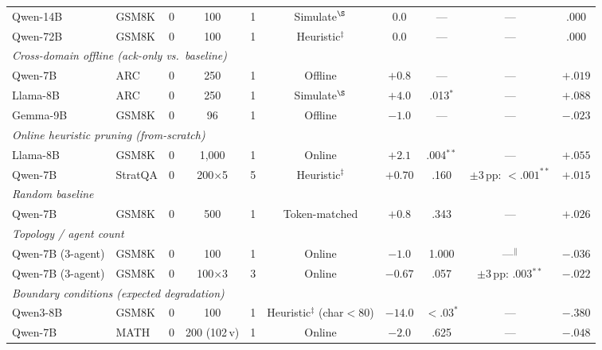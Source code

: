 \begin{table}[ht]
{\begin{tabular}{llccrccccc}
\midrule
Qwen-14B & GSM8K & 0 & 100 & 1 & Simulate$^\S$ & $0.0$ & --- & --- & $.000$ \\
Qwen-72B & GSM8K & 0 & 100 & 1 & Heuristic$^\ddagger$ & $0.0$ & --- & --- & $.000$ \\
\midrule
\multicolumn{10}{l}{\emph{Cross-domain offline (ack-only vs.\ baseline)}} \\
\midrule
Qwen-7B & ARC & 0 & 250 & 1 & Offline & $+0.8$ & --- & --- & $+.019$ \\
Llama-8B & ARC & 0 & 250 & 1 & Simulate$^\S$ & $+4.0$ & .013$^*$ & --- & $+.088$ \\
Gemma-9B & GSM8K & 0 & 96 & 1 & Offline & $-1.0$ & --- & --- & $-.023$ \\
\midrule
\multicolumn{10}{l}{\emph{Online heuristic pruning (from-scratch)}} \\
\midrule
Llama-8B & GSM8K & 0 & 1{,}000 & 1 & Online & $+2.1$ & .004$^{**}$ & --- & $+.055$ \\
Qwen-7B & StratQA & 0 & 200$\times$5 & 5 & Heuristic$^\ddagger$ & $+0.70$ & .160 & $\pm$3\,pp: ${<}.001^{**}$ & $+.015$ \\
\midrule
\multicolumn{10}{l}{\emph{Random baseline}} \\
\midrule
Qwen-7B & GSM8K & 0 & 500 & 1 & Token-matched & $+0.8$ & .343 & --- & $+.026$ \\
\midrule
\multicolumn{10}{l}{\emph{Topology / agent count}} \\
\midrule
Qwen-7B (3-agent) & GSM8K & 0 & 100 & 1 & Online & $-1.0$ & 1.000 & ---$^\|$ & $-.036$ \\
Qwen-7B (3-agent) & GSM8K & 0 & 100$\times$3 & 3 & Online & $-0.67$ & .057 & $\pm$3\,pp: .003$^{**}$ & $-.022$ \\
\midrule
\multicolumn{10}{l}{\emph{Boundary conditions (expected degradation)}} \\
\midrule
Qwen3-8B & GSM8K & 0 & 100 & 1 & Heuristic$^\ddagger$ (char$<$80) & $-14.0$ & ${<}.03^{*}$ & --- & $-.380$ \\
Qwen-7B & MATH & 0 & 200 (102\,v) & 1 & Online & $-2.0$ & .625 & --- & $-.048$ \\
\bottomrule
\end{tabular}%
}
\end{table}
